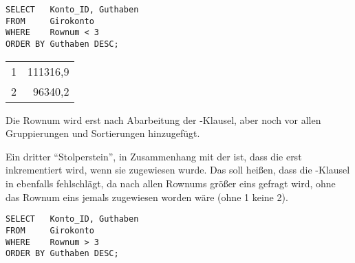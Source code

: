 \begin{lstlisting}[language=oracle_sql,caption={Falsche Anwendung der Rownum-Pseudospalte},label=sql06_12]
SELECT   Konto_ID, Guthaben
FROM     Girokonto
WHERE    Rownum < 3
ORDER BY Guthaben DESC;
          \end{lstlisting}
\begin{center}
    \begin{small}
        \tablehead{}

        \begin{oraclesql}
            \begin{supertabular}{rr}
                1 & 111316,9 \\
                2 & 96340,2 \\
            \end{supertabular}
        \end{oraclesql}
    \end{small}
\end{center}
\begin{merke}
    Die Rownum wird erst nach Abarbeitung der \WHERE-Klausel, aber noch vor allen Gruppierungen und Sortierungen hinzugefügt.
\end{merke}
Ein dritter \enquote{Stolperstein}, in Zusammenhang mit der  ist, dass die  erst inkrementiert wird, wenn sie zugewiesen wurde. Das soll heißen, dass die \WHERE-Klausel in  ebenfalls fehlschlägt, da nach allen Rownums größer eins gefragt wird, ohne das Rownum eins jemals zugewiesen worden wäre (ohne 1 keine 2).
\begin{lstlisting}[language=oracle_sql,caption={Erneut eine falsche Anwendung der Rownum},label=sql06_13]
SELECT   Konto_ID, Guthaben
FROM     Girokonto
WHERE    Rownum > 3
ORDER BY Guthaben DESC;
          \end{lstlisting}

